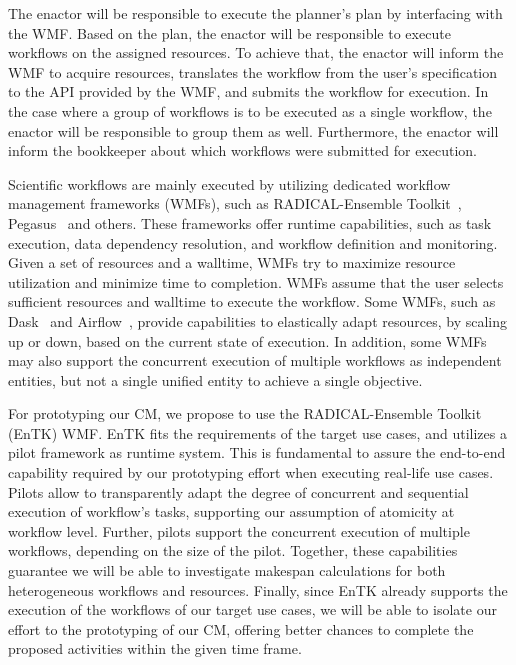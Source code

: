 The enactor will be responsible to execute the planner's plan by interfacing with the WMF.
Based on the plan, the enactor will be responsible to execute workflows on the assigned resources.
To achieve that, the enactor will inform the WMF to acquire resources, translates the workflow from the user's specification to the API provided by the WMF, and submits the workflow for execution.
In the case where a group of workflows is to be executed as a single workflow, the enactor will be responsible to group them as well.
Furthermore, the enactor will inform the bookkeeper about which workflows were submitted for execution.

Scientific workflows are mainly executed by utilizing dedicated workflow management frameworks (WMFs), such as RADICAL-Ensemble Toolkit~\cite{balasubramanian2018harnessing}, Pegasus~\cite{deelman2015pegasus} and others.
These frameworks offer runtime capabilities, such as task execution, data dependency resolution, and workflow definition and monitoring.
Given a set of resources and a walltime, WMFs try to maximize resource utilization and minimize time to completion.
WMFs assume that the user selects sufficient resources and walltime to execute the workflow.
Some WMFs, such as Dask~\cite{rocklin2015dask} and Airflow~\cite{airflow}, provide capabilities to elastically adapt resources, by scaling up or down, based on the current state of execution.
In addition, some  WMFs~\cite{deelman2015pegasus} may also support the concurrent execution of multiple workflows as independent entities, but not a single unified entity to achieve a single objective.

For prototyping our CM, we propose to use the RADICAL-Ensemble Toolkit~\cite{balasubramanian2018harnessing} (EnTK) WMF.
EnTK fits the requirements of the target use cases, and utilizes a pilot framework as runtime system. 
This is fundamental to assure the end-to-end capability required by our prototyping effort when executing real-life use cases. 
Pilots allow to transparently adapt the degree of concurrent and sequential execution of workflow's tasks, supporting our assumption of atomicity at workflow level. 
Further, pilots support the concurrent execution of multiple workflows, depending on the size of the pilot. 
Together, these capabilities guarantee we will be able to investigate makespan calculations for both heterogeneous workflows and resources. 
Finally, since EnTK already supports the execution of the workflows of our target use cases, we will be able to isolate our effort to the prototyping of our CM, offering better chances to complete the proposed activities within the given time frame.

